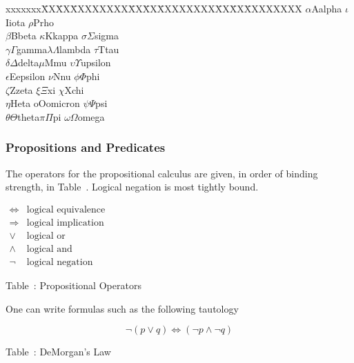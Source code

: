 \begin{tabbing}
xxxxxxx\=XX\=XX\=XXXXXXXX\=XX\=XX\=XXXXXXXX\=XX\=XX\=XXXXXXXX\kill
\>$\alpha$\>A\>alpha      \>$\iota$\>I\>iota    \>$\rho$\>P\>rho	\\
\>$\beta$\>B\>beta        \>$\kappa$\>K\>kappa  \>$\sigma$\>$\Sigma$\>sigma\\
\>$\gamma$\>$\Gamma$\>gamma\>$\lambda$\>$\Lambda$\>lambda  \>$\tau$\>T\>tau\\
\>$\delta$\>$\Delta$\>delta\>$\mu$\>M\>mu   \>$\upsilon$\>$\Upsilon$\>upsilon\\
\>$\epsilon$\>E\>epsilon  \>$\nu$\>N\>nu        \>$\phi$\>$\Phi$\>phi	\\
\>$\zeta$\>Z\>zeta        \>$\xi$\>$\Xi$\>xi    \>$\chi$\>X\>chi	\\
\>$\eta$\>H\>eta          \>o\>O\>omicron       \>$\psi$\>$\Psi$\>psi	\\
\>$\theta$\>$\Theta$\>theta\>$\pi$\>$\Pi$\>pi   \>$\omega$\>$\Omega$\>omega
\end{tabbing}

\subsubsection{Propositions and Predicates}
\setcounter{PropositionalOperators}{\value{table}}

The operators for the propositional calculus are given, in order of 
binding strength, in Table~\thetable. Logical negation is most tightly 
bound.
\begin{center}
$\begin{array}{ll}
\Leftrightarrow	& \mbox{logical equivalence}	\\
\Rightarrow	& \mbox{logical implication}	\\
\vee		& \mbox{logical or}		\\
\wedge		& \mbox{logical and}		\\
\neg		& \mbox{logical negation} 
\end{array}
$

Table~\thetable: Propositional Operators \end{center}

\setcounter{PropositionExamples}{\value{table}}

\noindent One can write formulas such as the following tautology

\begin{displaymath}
\neg(p \vee q) \Leftrightarrow (\neg p \wedge \neg q) 
\end{displaymath} 
\begin{center}
Table~\thetable: DeMorgan's Law
\end{center}


